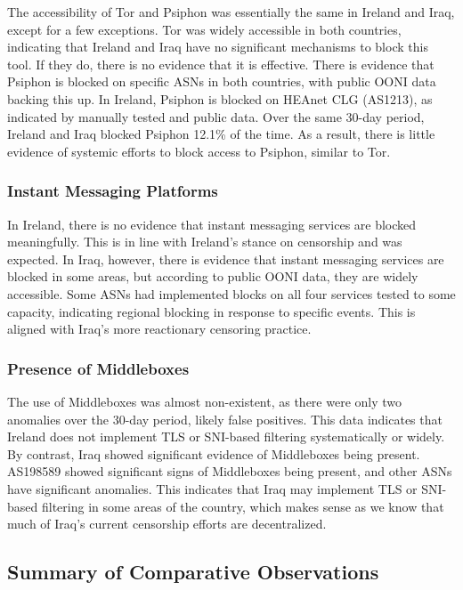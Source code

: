 The accessibility of Tor and Psiphon was essentially the same in Ireland and Iraq, except for a few exceptions. Tor was widely accessible in both countries, indicating that Ireland and Iraq have no significant mechanisms to block this tool. If they do, there is no evidence that it is effective. There is evidence that Psiphon is blocked on specific ASNs in both countries, with public OONI data backing this up. In Ireland, Psiphon is blocked on HEAnet CLG (AS1213), as indicated by manually tested and public data. Over the same 30-day period, Ireland and Iraq blocked Psiphon 12.1\% of the time. As a result, there is little evidence of systemic efforts to block access to Psiphon, similar to Tor.

\subsubsection{Instant Messaging Platforms}

In Ireland, there is no evidence that instant messaging services are blocked meaningfully. This is in line with Ireland's stance on censorship and was expected. In Iraq, however, there is evidence that instant messaging services are blocked in some areas, but according to public OONI data, they are widely accessible. Some ASNs had implemented blocks on all four services tested to some capacity, indicating regional blocking in response to specific events. This is aligned with Iraq's more reactionary censoring practice.

\subsubsection{Presence of Middleboxes}

The use of Middleboxes was almost non-existent, as there were only two anomalies over the 30-day period, likely false positives. This data indicates that Ireland does not implement TLS or SNI-based filtering systematically or widely. By contrast, Iraq showed significant evidence of Middleboxes being present. AS198589 showed significant signs of Middleboxes being present, and other ASNs have significant anomalies. This indicates that Iraq may implement TLS or SNI-based filtering in some areas of the country, which makes sense as we know that much of Iraq's current censorship efforts are decentralized. 

\subsection{Summary of Comparative Observations}

